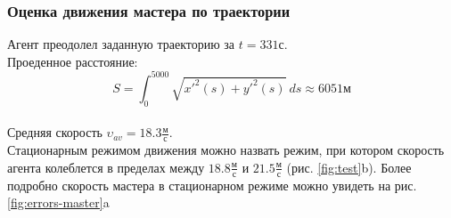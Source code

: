 \documentclass[a4paper, 14pt]{extarticle}
\begin{document}
\subsubsection{Оценка движения мастера по траектории}
Агент преодолел заданную траекторию за $t = 331 \text{с}$. \\
Проеденное расстояние:
$$ S = \int_{0}^{5000} \sqrt{x'^2(s) + y'^2(s)} \ ds \approx 6051 \text{м} $$ \\
Средняя скорость $\upsilon_{av} = 18.3  \frac{\text{м}}{\text{с}}$. \\
Стационарным режимом движения можно назвать режим, при котором скорость агента колеблется в пределах между $18.8\frac{\text{м}}{\text{с}}$ и $21.5\frac{\text{м}}{\text{с}}$ (рис. \ref{fig:test}b). Более подробно скорость мастера в стационарном режиме можно увидеть на рис. \ref{fig:errors-master}a \\
\end{document}
